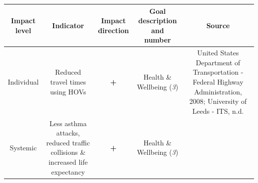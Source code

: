 \documentclass[
]{book}
\begin{document}
\begin{longtable}[]{@{}ccccc@{}}
\toprule
\begin{minipage}[b]{0.17\columnwidth}\centering
Impact level\strut
\end{minipage} & \begin{minipage}[b]{0.16\columnwidth}\centering
Indicator\strut
\end{minipage} & \begin{minipage}[b]{0.17\columnwidth}\centering
Impact direction\strut
\end{minipage} & \begin{minipage}[b]{0.17\columnwidth}\centering
Goal description and number\strut
\end{minipage} & \begin{minipage}[b]{0.17\columnwidth}\centering
Source\strut
\end{minipage}\tabularnewline
\midrule
\endhead
\begin{minipage}[t]{0.17\columnwidth}\centering
Individual\strut
\end{minipage} & \begin{minipage}[t]{0.16\columnwidth}\centering
Reduced travel times using HOVs\strut
\end{minipage} & \begin{minipage}[t]{0.17\columnwidth}\centering
\textbf{+}\strut
\end{minipage} & \begin{minipage}[t]{0.17\columnwidth}\centering
Health \& Wellbeing (\emph{3})\strut
\end{minipage} & \begin{minipage}[t]{0.17\columnwidth}\centering
United States Department of Transportation - Federal Highway Administration, 2008; University of Leeds - ITS, n.d.\strut
\end{minipage}\tabularnewline
\begin{minipage}[t]{0.17\columnwidth}\centering
Systemic\strut
\end{minipage} & \begin{minipage}[t]{0.16\columnwidth}\centering
Less asthma attacks, reduced traffic collisions \& increased life expectancy\strut
\end{minipage} & \begin{minipage}[t]{0.17\columnwidth}\centering
\textbf{+}\strut
\end{minipage} & \begin{minipage}[t]{0.17\columnwidth}\centering
Health \& Wellbeing (\emph{3})\strut
\end{minipage} & \begin{minipage}[t]{0.17\columnwidth}\centering

\end{minipage}
\end{longtable}
\end{document}

